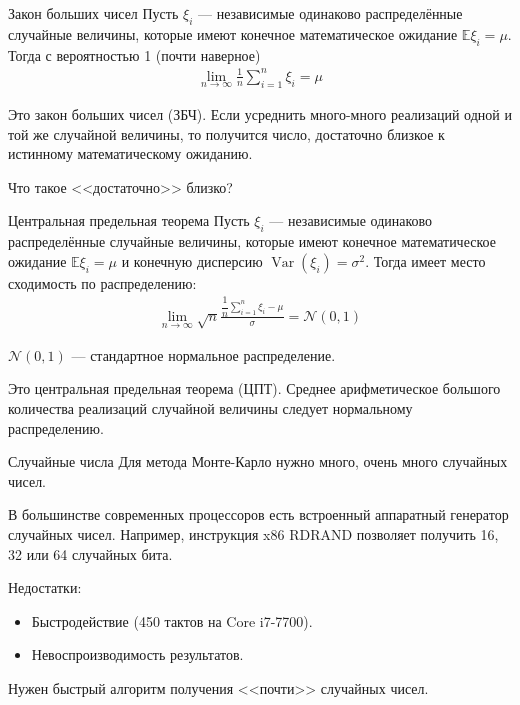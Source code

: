\documentclass{beamer}
\begin{document}
\begin{frame}{Закон больших чисел}
\justify
Пусть $\xi_i$ --- независимые одинаково распределённые случайные величины, которые имеют конечное математическое ожидание $\mathbb{E}\xi_i=\mu$. Тогда с вероятностью 1 (почти наверное)
\begin{align*}
\lim_{n \to \infty} \frac{1}{n} \sum\limits_{i=1}^{n}\xi_i = \mu
\end{align*}

\justify
Это \alert{закон больших чисел} (ЗБЧ). Если усреднить много-много реализаций одной и той же случайной величины, то получится число, достаточно близкое к истинному математическому ожиданию.

\justify
Что такое <<достаточно>> близко?
\end{frame}



\begin{frame}{Центральная предельная теорема}
\justify
Пусть $\xi_i$ --- независимые одинаково распределённые случайные величины, которые имеют конечное математическое ожидание $\mathbb{E}\xi_i=\mu$ и конечную дисперсию $\operatorname{Var}(\xi_i) = \sigma^2$. Тогда имеет место сходимость по распределению:
\begin{align*}
\lim_{n \to \infty} \sqrt{n}\frac{\dfrac{1}{n}\sum\limits_{i=1}^{n}\xi_i - \mu}{\sigma} = \mathcal{N}(0, 1)
\end{align*}

\justify
$\mathcal{N}(0, 1)$ --- стандартное нормальное распределение.

\justify
Это \alert{центральная предельная теорема} (ЦПТ). Среднее арифметическое большого количества реализаций случайной величины следует нормальному распределению.
\end{frame}



\begin{frame}{Случайные числа}
\justify
Для метода Монте-Карло нужно много, очень много случайных чисел.

\justify
В большинстве современных процессоров есть встроенный аппаратный генератор случайных чисел. Например, инструкция x86 RDRAND позволяет получить 16, 32 или 64 случайных бита.

\justify
Недостатки:
\begin{itemize}
\item Быстродействие (450 тактов на Core i7-7700).
\item Невоспроизводимость результатов.
\end{itemize}

\justify
Нужен быстрый алгоритм получения <<почти>> случайных чисел.
\end{frame}
\end{document}

